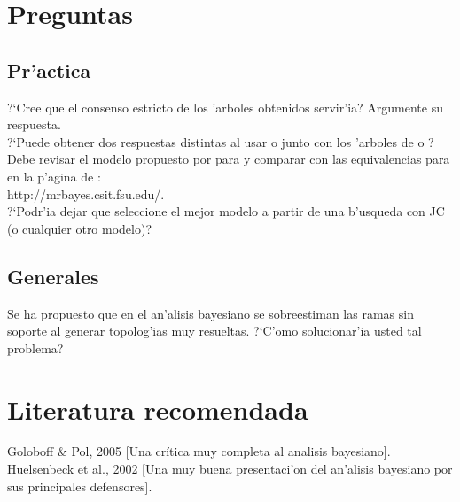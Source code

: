 \section{Preguntas}
\subsection{Pr'actica}
\noindent
?`Cree que el consenso estricto de los 'arboles obtenidos servir'ia? Argumente su respuesta.\\
?`Puede obtener dos respuestas distintas al usar  o   junto con los 'arboles de  o ?\\
Debe revisar el modelo propuesto por  para  y comparar con las equivalencias para  en la p'agina de :\\
http://mrbayes.csit.fsu.edu/.\\
?`Podr'ia dejar que  seleccione el mejor modelo a partir de una b'usqueda con JC (o cualquier otro modelo)?\\
\subsection{Generales}
\noindent
Se ha propuesto que en el an'alisis bayesiano se sobreestiman las ramas sin soporte al generar topolog'ias muy resueltas. ?`C'omo solucionar'ia usted tal problema?
\section{Literatura recomendada}
\noindent
Goloboff \& Pol, 2005 [Una cr\'itica muy completa al analisis bayesiano].\\
Huelsenbeck et al., 2002 [Una muy buena presentaci'on del an'alisis bayesiano por sus principales defensores].
